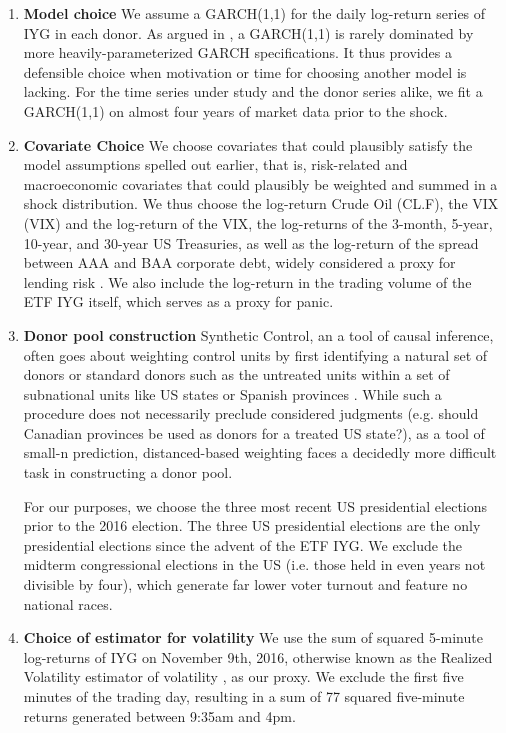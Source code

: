 \documentclass[11pt]{article}
\theoremstyle{definition}
\begin{document}
\begin{enumerate}
    \item \textbf{Model choice} We assume a GARCH(1,1) for the daily log-return series of IYG in each donor.  As argued in \citet{hansen2005forecast}, a GARCH(1,1) is rarely dominated by more heavily-parameterized GARCH specifications.  It thus provides a defensible choice when motivation or time for choosing another model is lacking.  For the time series under study and the donor series alike, we fit a GARCH(1,1) on almost four years of market data prior to the shock.

    \item \textbf{Covariate Choice} We choose covariates that could plausibly satisfy the model assumptions spelled out earlier, that is, risk-related and macroeconomic covariates that could plausibly be weighted and summed in a shock distribution.  We thus choose the log-return Crude Oil (CL.F), the VIX (VIX) and the log-return of the VIX, the log-returns of the 3-month, 5-year, 10-year, and 30-year US Treasuries, as well as the log-return of the spread between AAA and BAA corporate debt, widely considered a proxy for lending risk \citep{goodell2013us, kane1996p}.  We also include the log-return in the trading volume of the ETF IYG itself, which serves as a proxy for panic.

    \item \textbf{Donor pool construction} Synthetic Control, an a tool of causal inference, often goes about weighting control units by first identifying a natural set of donors or standard donors such as the untreated units within a set of subnational units like US states or Spanish provinces \citep{abadie2003economic, abadie2010synthetic}.  While such a procedure does not necessarily preclude considered judgments (e.g. should Canadian provinces be used as donors for a treated US state?), as a tool of small-n prediction, distanced-based weighting faces a decidedly more difficult task in constructing a donor pool.  
    
    For our purposes, we choose the three most recent US presidential elections prior to the 2016 election.  The three US presidential elections are the only presidential elections since the advent of the ETF IYG.  We exclude the midterm congressional elections in the US (i.e. those held in even years not divisible by four), which generate far lower voter turnout and feature no national races.

    \item \textbf{Choice of estimator for volatility} We use the sum of squared 5-minute log-returns of IYG on November 9th, 2016, otherwise known as the Realized Volatility estimator of volatility \citep{andersen2009realized}, as our proxy.  We exclude the first five minutes of the trading day, resulting in a sum of 77 squared five-minute returns generated between 9:35am and 4pm.
\end{enumerate} 
\end{document}
